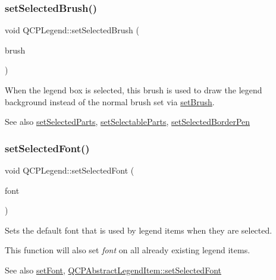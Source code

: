 \subsubsection{\texorpdfstring{set\+Selected\+Brush()}{setSelectedBrush()}}
{\footnotesize\ttfamily void Q\+C\+P\+Legend\+::set\+Selected\+Brush (\begin{DoxyParamCaption}\item[{const Q\+Brush \&}]{brush }\end{DoxyParamCaption})}

When the legend box is selected, this brush is used to draw the legend background instead of the normal brush set via \hyperlink{class_q_c_p_legend_a497bbcd38baa3598c08e2b3f48103f23}{set\+Brush}.

\begin{DoxySeeAlso}{See also}
\hyperlink{class_q_c_p_legend_a2aee309bb5c2a794b1987f3fc97f8ad8}{set\+Selected\+Parts}, \hyperlink{class_q_c_p_legend_a9ce60aa8bbd89f62ae4fa83ac6c60110}{set\+Selectable\+Parts}, \hyperlink{class_q_c_p_legend_a2c35d262953a25d96b6112653fbefc88}{set\+Selected\+Border\+Pen} 
\end{DoxySeeAlso}
\mbox{\label{class_q_c_p_legend_ab580a01c3c0a239374ed66c29edf5ad2}} 
\subsubsection{\texorpdfstring{set\+Selected\+Font()}{setSelectedFont()}}
{\footnotesize\ttfamily void Q\+C\+P\+Legend\+::set\+Selected\+Font (\begin{DoxyParamCaption}\item[{const Q\+Font \&}]{font }\end{DoxyParamCaption})}

Sets the default font that is used by legend items when they are selected.

This function will also set {\itshape font} on all already existing legend items.

\begin{DoxySeeAlso}{See also}
\hyperlink{class_q_c_p_legend_aa4cda8499e3cb0f3be415edc02984c73}{set\+Font}, \hyperlink{class_q_c_p_abstract_legend_item_a91db5aee48617a9d3206e61376807365}{Q\+C\+P\+Abstract\+Legend\+Item\+::set\+Selected\+Font} 
\end{DoxySeeAlso}
\mbox{\label{class_q_c_p_legend_ade93aabe9bcccaf9cf46cec22c658027}} 
